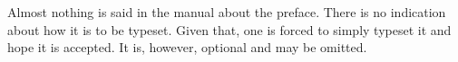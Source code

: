\documentclass[12pt]{ucsddissertation}
\begin{document}
\tableofcontents
\listoffigures
\listoftables

\begin{preface}
Almost nothing is said in the manual about the preface. There is no
indication about how it is to be typeset. Given that, one is forced to
simply typeset it and hope it is accepted. It is, however, optional
and may be omitted.
\end{preface}

\begin{acknowledgements}
\end{acknowledgements}
\end{document}
